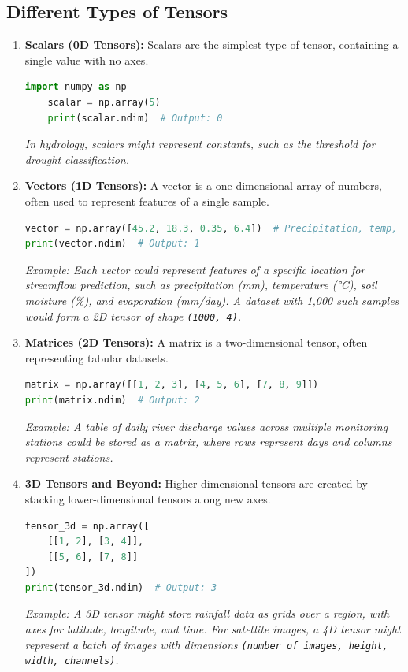 \subsection{Different Types of Tensors}
\begin{enumerate}
    \item \textbf{Scalars (0D Tensors):} Scalars are the simplest type of tensor, containing a single value with no axes.
    \begin{lstlisting}[language=Python]
    import numpy as np
    scalar = np.array(5)
    print(scalar.ndim)  # Output: 0
    \end{lstlisting}
    \textit{In hydrology, scalars might represent constants, such as the threshold for drought classification.}

    \item \textbf{Vectors (1D Tensors):} A vector is a one-dimensional array of numbers, often used to represent features of a single sample.
    \begin{lstlisting}[language=Python]
vector = np.array([45.2, 18.3, 0.35, 6.4])  # Precipitation, temp, soil moisture, evaporation
print(vector.ndim)  # Output: 1
    \end{lstlisting}
    \textit{Example: Each vector could represent features of a specific location for streamflow prediction, such as precipitation (mm), temperature (°C), soil moisture (\%), and evaporation (mm/day). A dataset with 1,000 such samples would form a 2D tensor of shape \texttt{(1000, 4)}.}

    \item \textbf{Matrices (2D Tensors):} A matrix is a two-dimensional tensor, often representing tabular datasets.
    \begin{lstlisting}[language=Python]
matrix = np.array([[1, 2, 3], [4, 5, 6], [7, 8, 9]])
print(matrix.ndim)  # Output: 2
    \end{lstlisting}
    \textit{Example: A table of daily river discharge values across multiple monitoring stations could be stored as a matrix, where rows represent days and columns represent stations.}

    \item \textbf{3D Tensors and Beyond:} Higher-dimensional tensors are created by stacking lower-dimensional tensors along new axes.
    \begin{lstlisting}[language=Python]
tensor_3d = np.array([
    [[1, 2], [3, 4]],
    [[5, 6], [7, 8]]
])
print(tensor_3d.ndim)  # Output: 3
    \end{lstlisting}
    \textit{Example: A 3D tensor might store rainfall data as grids over a region, with axes for latitude, longitude, and time. For satellite images, a 4D tensor might represent a batch of images with dimensions \texttt{(number of images, height, width, channels)}.}
\end{enumerate}

